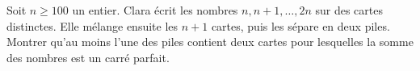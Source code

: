 Soit $n \geqslant 100$ un entier. Clara écrit les nombres $n, n+1, \ldots, 2n$ sur des cartes
distinctes. Elle mélange ensuite les $n+1$ cartes, puis les sépare en deux piles. Montrer qu'au moins
l'une des piles contient deux cartes pour lesquelles la somme des nombres est un carré parfait.
